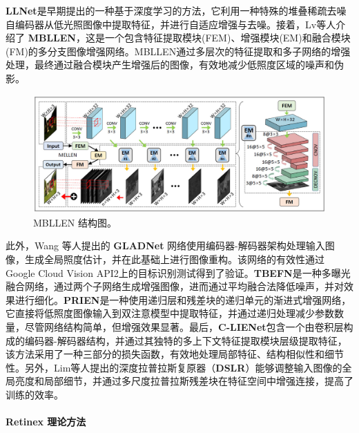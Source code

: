 \documentclass[a4paper]{ctexart}
\begin{document}
	\textbf{LLNet}\cite{lore2017llnet}是早期提出的一种基于深度学习的方法，它利用一种特殊的堆叠稀疏去噪自编码器从低光照图像中提取特征，并进行自适应增强与去噪。接着，Lv等人\cite{lv2018mbllen}介绍了 \textbf{MBLLEN}，这是一个包含特征提取模块(FEM)、增强模块(EM)和融合模块(FM)的多分支图像增强网络。MBLLEN通过多层次的特征提取和多子网络的增强处理，最终通过融合模块产生增强后的图像，有效地减少低照度区域的噪声和伪影。
	
	\begin{figure}[htb]
		\centering 
		\includegraphics[width=\columnwidth]{picture/LLIE/MBLLEN/MBLLEN Architecture}
		\caption{
			\label{fig: MBLLEN Architecture} 
			MBLLEN 结构图。
		}
	\end{figure}
	
	此外，Wang 等人\cite{wang2018gladnet}提出的 \textbf{GLADNet} 网络使用编码器-解码器架构处理输入图像，生成全局照度估计，并在此基础上进行图像重构。该网络的有效性通过Google Cloud Vision API2上的目标识别测试得到了验证。\textbf{TBEFN}\cite{lu2020tbefn}是一种多曝光融合网络，通过两个子网络生成增强图像，进而通过平均融合法降低噪声，并对效果进行细化。\textbf{PRIEN}\cite{li2021low}是一种使用递归层和残差块的递归单元的渐进式增强网络，它直接将低照度图像输入到双注意模型中提取特征，并通过递归处理减少参数数量，尽管网络结构简单，但增强效果显著。最后，\textbf{C-LIENet}\cite{ravirathinam2021c}包含一个由卷积层构成的编码器-解码器结构，并通过其独特的多上下文特征提取模块层级提取特征，该方法采用了一种三部分的损失函数，有效地处理局部特征、结构相似性和细节性。另外，Lim等人\cite{lim2020dslr}提出的深度拉普拉斯复原器（\textbf{DSLR}）能够调整输入图像的全局亮度和局部细节，并通过多尺度拉普拉斯残差块在特征空间中增强连接，提高了训练的效率。
	
	\paragraph{Retinex 理论方法}
	
\end{document}
